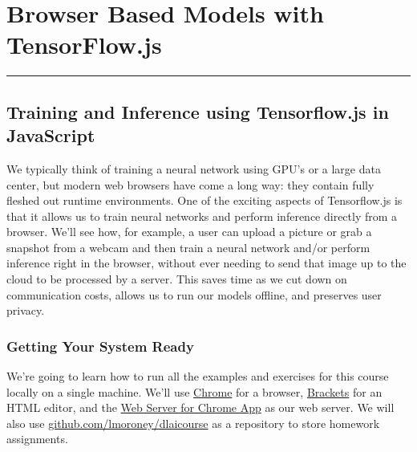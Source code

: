 \documentclass[12pt]{article}
\begin{document}
\renewcommand{\d}[1]{\ensuremath{\operatorname{d}\!{#1}}}

\tableofcontents
\newpage
\section{Browser Based Models with TensorFlow.js}\vspace{.1pt} \hrule height 2pt \smallskip \renewcommand{\arraystretch}{1}
\subsection{Training and Inference using Tensorflow.js in JavaScript} We typically think of training a neural network using GPU's or a large data center, but modern web browsers have come a long way: they contain fully fleshed out runtime environments. One of the exciting aspects of Tensorflow.js is that it allows us to train neural networks and perform inference directly from a browser. We'll see how, for example, a user can upload a picture or grab a snapshot from a webcam and then train a neural network and/or perform inference right in the browser, without ever needing to send that image up to the cloud to be processed by a server. This saves time as we cut down on communication costs,
allows us to run our models offline, and preserves user privacy.

\subsubsection{Getting Your System Ready} We're going to learn how to run all the examples and exercises for this course locally on a single machine. We'll use \href{https://www.google.com/chrome/}{Chrome} for a browser, \href{http://brackets.io/}{Brackets} for an HTML editor, and the \href{https://chrome.google.com/webstore/detail/web-server-for-chrome/ofhbbkphhbklhfoeikjpcbhemlocgigb?hl=en}{Web Server for Chrome App} as our web server. We will also use \href{https://github.com/lmoroney/dlaicourse}{github.com/lmoroney/dlaicourse} as a repository to store homework assignments.
\end{document}
